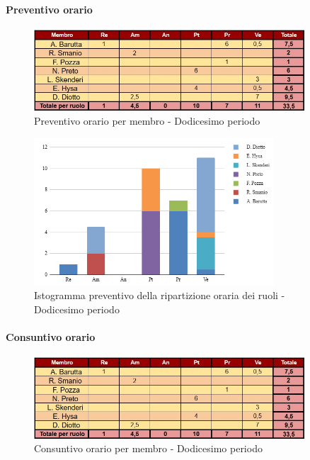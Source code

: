 \paragraph{Preventivo orario}

\begin{figure}[H] 
    \centering
    \includegraphics[width=0.9\textwidth]{../Images/preventivoOrario12Periodo.jpeg}
    \caption{Preventivo orario per membro - Dodicesimo periodo}
    \label{fig:Preventivo_orario_12}
\end{figure}

\begin{figure}[H]
    \centering
    \includegraphics[width=0.8\textwidth]{../Images/preventivoDivisioneRuoli12Periodo.png}
    \caption{Istogramma preventivo della ripartizione oraria dei ruoli - Dodicesimo periodo}
    \label{fig:Preventivo_ripartizione_oraria_12}
\end{figure}

\paragraph{Consuntivo orario}

\begin{figure}[H]
    \centering
    \includegraphics[width=0.9\textwidth]{../Images/consuntivoOrario12Periodo.jpeg}
    \caption{Consuntivo orario per membro - Dodicesimo periodo}
    \label{fig:Constuntivo_orario_12}
\end{figure}

